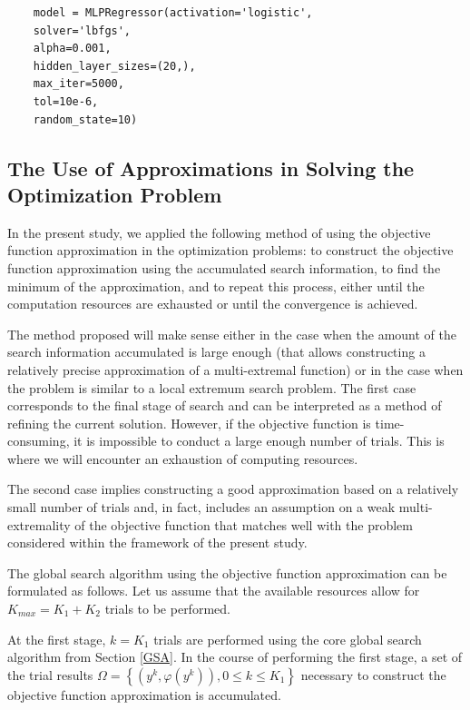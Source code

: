\documentclass[mathematics,article,accept,pdftex,moreauthors]{Definitions/mdpi}
\begin{document}
 

\begin{verbatim}
    model = MLPRegressor(activation='logistic',
	solver='lbfgs',
	alpha=0.001,
	hidden_layer_sizes=(20,),
	max_iter=5000,
	tol=10e-6,
	random_state=10)
\end{verbatim}


\subsection{The Use of Approximations in Solving the Optimization Problem}\label{GSA_Appr}

In the present study, we applied the following method of using the objective function approximation in the optimization problems: to construct the objective function approximation using the accumulated search information, to find the minimum of the approximation, and to repeat this process, either until the computation resources are exhausted or until the convergence is achieved.

The method proposed will make sense either in the case when the amount of the search information accumulated is large enough (that allows constructing a relatively precise approximation of a multi-extremal function) or in the case when the problem is similar to a local extremum search problem.
The first case corresponds to the final stage of search and can be interpreted as a method of refining the current solution. However, if the objective function is time-consuming, it is impossible to conduct a large enough number of trials. This is where we will encounter an exhaustion of computing resources.

The second case implies constructing a good approximation based on a relatively small number of trials and, in fact, includes an assumption on a weak multi-extremality of the objective function that matches well with the problem considered within the framework of the present study.
 
The global search algorithm using the objective function approximation can be formulated as follows.
Let us assume that the available resources allow for $K_{max} = K_1 + K_2$ trials to be performed.

At the first stage, $k = K_1$ trials are performed using the core global search algorithm from Section \ref{GSA}.
In the course of performing the first stage, a set of the trial results $\Omega = \left\{(y^k, \varphi(y^k)), 0\leq k\leq K_1\right\}$ necessary to construct the objective function approximation is accumulated.
\end{document}
